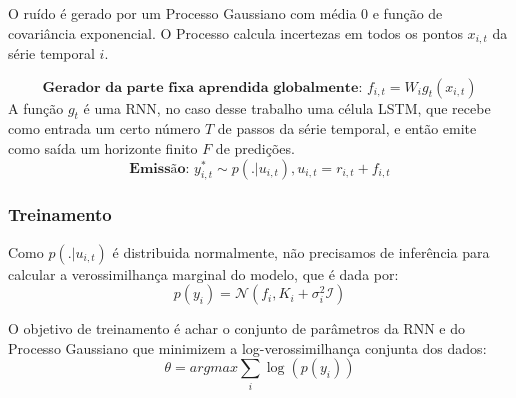 O ruído é gerado por um Processo Gaussiano com média 0 e função de covariância exponencial. O Processo calcula incertezas em todos os pontos $x_{i,t}$ da série temporal $i$.
  
\[
  \textbf{Gerador da parte fixa aprendida globalmente: }  f_{i,t} = W_ig_t(x_{i,t})
\]
A função $g_t$ é uma RNN, no caso desse trabalho uma célula LSTM, que recebe como entrada um certo número $T$ de passos da série temporal, e então emite como saída um horizonte finito $F$ de predições.
\[
  \textbf{Emissão: }  y^*_{i,t} \sim p(. | u_{i,t}) , u_{i,t} = r_{i,t} + f_{i,t}  
\]

\subsubsection{Treinamento}

Como $p(. | u_{i,t})$ é distribuida normalmente, não precisamos de inferência para calcular a verossimilhança marginal do modelo, que é dada por: \\

\[
p(y_{i}) = \mathcal{N}(f_i,K_i + \sigma_i^2\mathcal{I})
\]

O objetivo de treinamento é achar o conjunto de parâmetros da RNN e do Processo Gaussiano que minimizem a log-verossimilhança conjunta dos dados: \\
\[
\theta = argmax \sum_i{\log(p(y_i))}
\]


